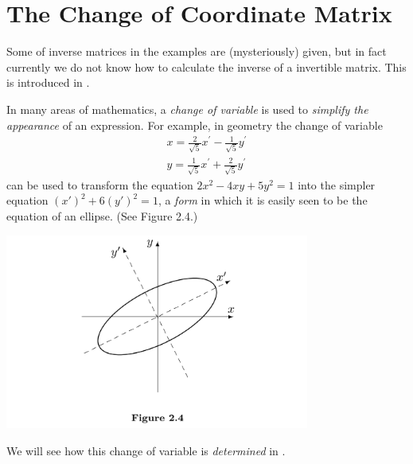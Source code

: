 \section{The Change of Coordinate Matrix} \label{sec 2.5}

\begin{note}
Some of inverse matrices in the examples are (mysteriously) given, but in fact currently we do not know how to calculate the inverse of a invertible matrix.
This is introduced in .
\end{note}

In many areas of mathematics, a \emph{change of variable} is used to \emph{simplify the appearance} of an expression.
For example, in geometry the change of variable
\[
    \begin{array}{l}
        x=\frac{2}{\sqrt{5}} x^{\prime}-\frac{1}{\sqrt{5}} y^{\prime} \\
        y=\frac{1}{\sqrt{5}} x^{\prime}+\frac{2}{\sqrt{5}} y^{\prime}
\end{array}
\]
can be used to transform the equation \(2x^2 - 4xy + 5y^2 = 1\) into the simpler equation \((x')^2 + 6(y')^2 = 1\), a \emph{form} in which it is easily seen to be the equation of an ellipse. (See Figure 2.4.)

\includegraphics[width=10cm]{images/figure-2-4.png}

We will see how this change of variable is \emph{determined} in .

